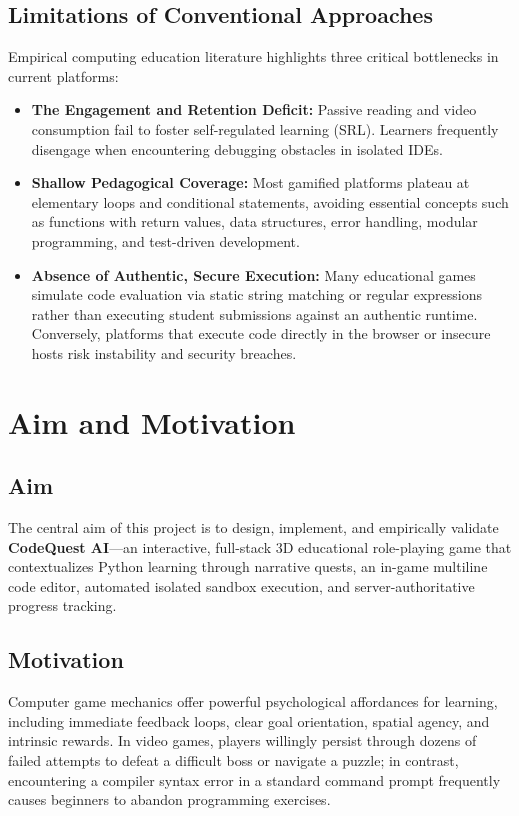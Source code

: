 \subsection{Limitations of Conventional Approaches}
Empirical computing education literature highlights three critical bottlenecks in current platforms:
\begin{itemize}
    \item \textbf{The Engagement and Retention Deficit:} Passive reading and video consumption fail to foster self-regulated learning (SRL). Learners frequently disengage when encountering debugging obstacles in isolated IDEs.
    \item \textbf{Shallow Pedagogical Coverage:} Most gamified platforms plateau at elementary loops and conditional statements, avoiding essential concepts such as functions with return values, data structures, error handling, modular programming, and test-driven development.
    \item \textbf{Absence of Authentic, Secure Execution:} Many educational games simulate code evaluation via static string matching or regular expressions rather than executing student submissions against an authentic runtime. Conversely, platforms that execute code directly in the browser or insecure hosts risk instability and security breaches.
\end{itemize}

\section{Aim and Motivation}

\subsection{Aim}
The central aim of this project is to design, implement, and empirically validate \textbf{CodeQuest AI}---an interactive, full-stack 3D educational role-playing game that contextualizes Python learning through narrative quests, an in-game multiline code editor, automated isolated sandbox execution, and server-authoritative progress tracking.

\subsection{Motivation}
Computer game mechanics offer powerful psychological affordances for learning, including immediate feedback loops, clear goal orientation, spatial agency, and intrinsic rewards. In video games, players willingly persist through dozens of failed attempts to defeat a difficult boss or navigate a puzzle; in contrast, encountering a compiler syntax error in a standard command prompt frequently causes beginners to abandon programming exercises.

